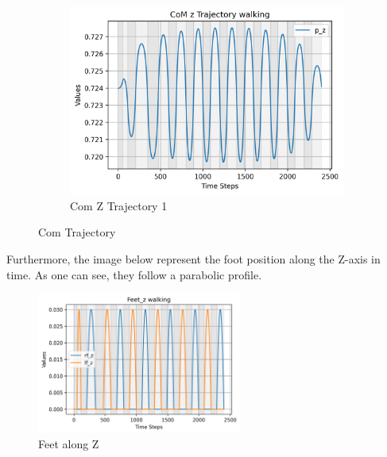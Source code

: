 \documentclass[main.tex]{subfiles}
\begin{document}
\begin{figure}[H]
\begin{subfigure}[b]{0.45\textwidth}
        \includegraphics[width=\textwidth]{figures/CoM z Trajectory walking.png}
        \caption{Com Z Trajectory 1}
        \label{fig:sub3_walking}
    \end{subfigure}
    \caption{Com Trajectory}
    \label{fig:threeimages_walking}
\end{figure}
Furthermore, the image below represent the foot position along the Z-axis in time. As one can see, they follow a parabolic profile.  
\begin{figure}[htbp]
    \centering
    \includegraphics[width=0.6\textwidth]{figures/Feet_z walking.png}
    \caption{Feet along Z}
    \label{fig:feet_walking}
\end{figure}
\end{document}
